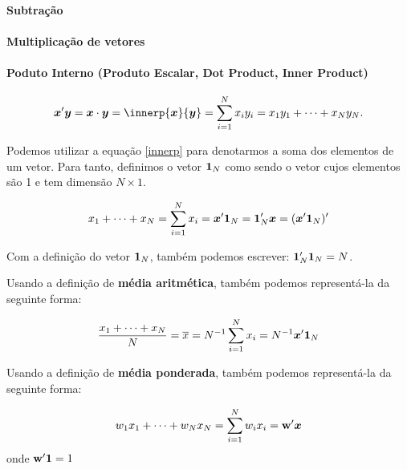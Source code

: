 \documentclass[11pt, oneside, a4paper, article]{article}
\numberwithin{equation}{section}
\begin{document}
\begin{description}
\paragraph{Subtração}

\paragraph{Multiplicação de vetores}

\paragraph{Poduto Interno (Produto Escalar, Dot Product, Inner Product)}

\begin{align}\label{innerp}
\xvec' \yvec = \xvec \cdot \yvec = \innerp{\xvec}{\yvec} = \sum_{i=1}^{N} x_{i} y_{i} = x_{1}y_{1} + \dots + x_{N}y_{N}.
\end{align}

Podemos utilizar a equação \eqref{innerp} para denotarmos a soma dos elementos de um vetor.
Para tanto, definimos o vetor $\boldsymbol{1}_{N}$ como sendo o vetor cujos elementos são 1 e tem dimensão $N \times 1$.
\cite[p. 977, A.2.7]{greene-7ed}

\begin{align*}
x_{1} + \dots + x_{N} =
\sum_{i=1}^{N} x_{i} =
\boldsymbol{x}' \boldsymbol{1}_{N} = 
\boldsymbol{1}_{N}' \boldsymbol{x} = 
(\boldsymbol{x}' \boldsymbol{1}_{N})'
\end{align*}

Com a definição do vetor $\boldsymbol{1}_{N}$, também podemos escrever:
$\boldsymbol{1}_{N}' \boldsymbol{1}_{N} = N$.

Usando a definição de \textbf{média aritmética}, também podemos representá-la da seguinte forma:

\begin{align*}
\frac{x_{1} + \dots + x_{N}}{N} =
\overline{x} =
N^{-1} \sum_{i=1}^{N} x_{i} =
N^{-1} \boldsymbol{x}' \boldsymbol{1}_{N}
\end{align*}

Usando a definição de \textbf{média ponderada}, também podemos representá-la da seguinte forma:

\begin{align*}
w_{1}x_{1} + \dots + w_{N}x_{N} =
\sum_{i=1}^{N} w_{i} x_{i} =
\mathbf{w}'\boldsymbol{x}
\end{align*}
onde $\mathbf{w}'\boldsymbol{1}=1$


\end{description}
\end{document}
